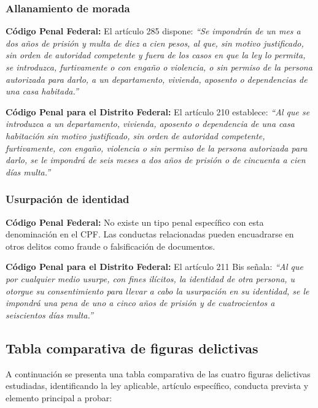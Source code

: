 \documentclass[12pt,letterpaper]{article}
\begin{document}
\subsubsection{Allanamiento de morada}

\textbf{Código Penal Federal:} El artículo 285 dispone: \emph{``Se impondrán de un mes a dos años de prisión y multa de diez a cien pesos, al que, sin motivo justificado, sin orden de autoridad competente y fuera de los casos en que la ley lo permita, se introduzca, furtivamente o con engaño o violencia, o sin permiso de la persona autorizada para darlo, a un departamento, vivienda, aposento o dependencias de una casa habitada.''}

\textbf{Código Penal para el Distrito Federal:} El artículo 210 establece: \emph{``Al que se introduzca a un departamento, vivienda, aposento o dependencia de una casa habitación sin motivo justificado, sin orden de autoridad competente, furtivamente, con engaño, violencia o sin permiso de la persona autorizada para darlo, se le impondrá de seis meses a dos años de prisión o de cincuenta a cien días multa.''}

\subsubsection{Usurpación de identidad}

\textbf{Código Penal Federal:} No existe un tipo penal específico con esta denominación en el CPF. Las conductas relacionadas pueden encuadrarse en otros delitos como fraude o falsificación de documentos.

\textbf{Código Penal para el Distrito Federal:} El artículo 211 Bis señala: \emph{``Al que por cualquier medio usurpe, con fines ilícitos, la identidad de otra persona, u otorgue su consentimiento para llevar a cabo la usurpación en su identidad, se le impondrá una pena de uno a cinco años de prisión y de cuatrocientos a seiscientos días multa.''}


\subsection{Tabla comparativa de figuras delictivas}

A continuación se presenta una tabla comparativa de las cuatro figuras delictivas estudiadas, identificando la ley aplicable, artículo específico, conducta prevista y elemento principal a probar:
\end{document}
